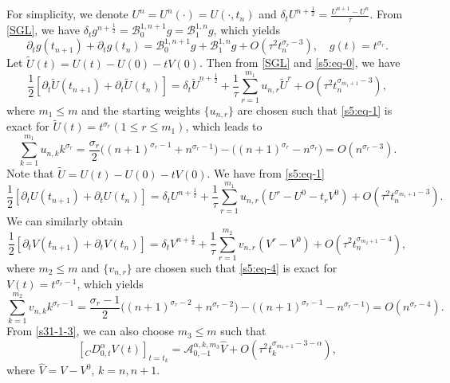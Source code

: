 \documentclass[10pt]{siamltex}
\newcommand{\px}[1][x]{\partial_{#1}}
\newcommand{\mfrac}[1][2]{\frac{1}{2}}
\begin{document}
For simplicity,  we denote  $U^n=U^n(\cdot)=U(\cdot,t_n)$ and
 $\delta_tU^{n+\mfrac}=\frac{U^{n+1}-U^n}{\tau}.$
From \eqref{SGL}, we have $\delta_tg^{n+\mfrac}=\mathcal{B}^{1,n+1}_{0}g
=\mathcal{B}^{1,n}_{1}g$, which yields
\begin{equation}\label{s5:eq-0}
 \px[t]g(t_{n+1})+\px[t]g(t_{n})
 =\mathcal{B}^{1,n+1}_{0}g+\mathcal{B}^{1,n}_{1}g
 +O(\tau^2t_{n}^{\sigma_r-3}),{\quad}g(t)=t^{\sigma_r}.
\end{equation}
Let $\widetilde{U}(t)=U(t)-U(0)-tV(0)$. Then   from \eqref{SGL} and \eqref{s5:eq-0},  we have
\begin{equation}\label{s5:eq-1}
\frac{1}{2}\left[\px[t]\widetilde{U}(t_{n+1})+\px[t]\widetilde{U}(t_{n})\right]
=\delta_t\widetilde{U}^{n+\mfrac}
+\frac{1}{\tau}\sum_{r=1}^{m_1} u_{n,r}\widetilde{U}^r
+O(\tau^2t_{n}^{\sigma_{m_1+1}-3}),
\end{equation}
where $m_1\leq m$ and the starting weights $\{u_{n,r}\}$ are chosen such that \eqref{s5:eq-1} is exact for
$\widetilde{U}(t)=t^{\sigma_r}(1\leq r \leq m_1)$, which leads to %
\begin{equation}\label{s5:eq-2}
\sum_{k=1}^{m_1} u_{n,k}k^{\sigma_r}
=\frac{\sigma_r}{2}\Big((n+1)^{\sigma_r-1}+n^{\sigma_r-1}\Big)
-\Big((n+1)^{\sigma_r}-n^{\sigma_r}\Big)=O(n^{\sigma_r-3}).
\end{equation}
Note that $\widetilde{U}=U(t)-U(0)-tV(0)$. We have from \eqref{s5:eq-1}
\begin{equation}\label{s5:eq-3}
\frac{1}{2}\left[\px[t]{U}(t_{n+1})+\px[t]{U}(t_{n})\right]
=\delta_t{U}^{n+\mfrac}
+\frac{1}{\tau}\sum_{r=1}^{m_1} u_{n,r}(U^r-U^0-t_rV^0)
+O(\tau^2t_{n}^{\sigma_{m_1+1}-3}).
\end{equation}
%
We can similarly  obtain
\begin{equation}\label{s5:eq-4}
\frac{1}{2}\left[\px[t]{V}(t_{n+1})+\px[t]{V}(t_{n})\right]
=\delta_t{V}^{n+\mfrac}
 +\frac{1}{\tau}\sum_{r=1}^{m_2} v_{n,r}(V^r-V^0)
 +O(\tau^2t_{n}^{\sigma_{m_2+1}-4}),
\end{equation}
where $m_2\leq m$ and $\{v_{n,r}\}$ are chosen such that \eqref{s5:eq-4} is exact
for $V(t)=t^{\sigma_r-1}$, which yields
\begin{equation}\label{s5:eq-5}
\sum_{k=1}^{m_2} v_{n,k}k^{\sigma_r-1}
=\frac{\sigma_r-1}{2}\Big((n+1)^{\sigma_r-2}+n^{\sigma_r-2}\Big)
-\Big((n+1)^{\sigma_r-1}-n^{\sigma_r-1}\Big)=O(n^{\sigma_r-4}).
\end{equation}
%
From %
\eqref{s31-1-3},  we can also choose $m_3\leq m$ such that
\begin{equation}\label{s5:eq-5-2}
\left[{}_CD_{0,t}^{\alpha}V(t)\right]_{t=t_{k}}
=\mathcal{{A}}_{0,-1}^{\alpha,k,m_3}\widehat{V}
+O(\tau^2t_{k}^{\sigma_{m_3+1}-3-\alpha}),
\end{equation}
where $\widehat{V}=V-V^0$, $k=n,n+1$.
\end{document}
